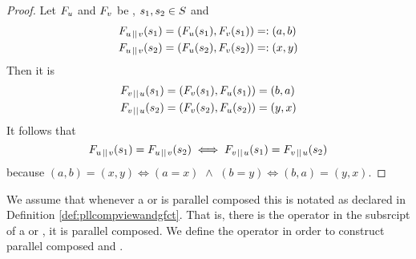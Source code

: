\documentclass[preview]{standalone}
\begin{document}
\begin{proof}
	Let $\grpfct[u]$ and $\grpfct[v]$ be \grpfctsN, $\state_1, \state_2 \in \states$ and
	\begin{align*}
		\grpfct[u \pll v](\state_1) &= (\grpfct[u](\state_1), \grpfct[v](\state_1)) =: (a, b) \\
		\grpfct[u \pll v](\state_2) &= (\grpfct[u](\state_2), \grpfct[v](\state_2)) =: (x, y)			
	\end{align*}
	Then it is
	\begin{align*}
		\grpfct[v \pll u](\state_1) &= (\grpfct[v](\state_1), \grpfct[u](\state_1)) = (b, a) \\
		\grpfct[v \pll u](\state_2) &= (\grpfct[v](\state_2), \grpfct[u](\state_2)) = (y, x)
	\end{align*}
	It follows that
	\[
	\grpfct[u \pll v](\state_1) = \grpfct[u \pll v](\state_2) \iff \grpfct[v \pll u](\state_1) = \grpfct[v \pll u](\state_2)
	\]
	because $(a, b) = (x, y) \iff (a = x) \,\, \land \,\, (b = y) \iff (b, a) = (y, x)$.
\end{proof}

We assume that whenever a \viewN or \grpfctN is parallel composed this is notated as declared in Definition \ref{def:pllcompviewandgfct}. That is, \iffN there is the operator \pll in the subsrcipt of a \viewN or \grpfctN, it is parallel composed. We define the operator \pll in order to construct parallel composed \grpfctsN and \viewsN. 
\end{document}
